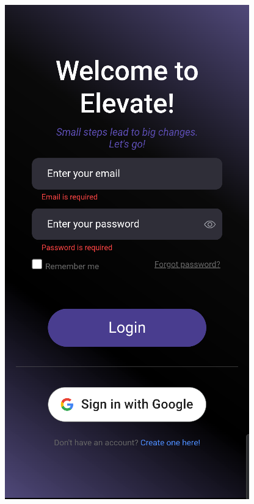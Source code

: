 \documentclass[12pt]{report}
\begin{document}
\begin{figure}[H]
    \centering
    \begin{minipage}[b]{0.23\textwidth}
        \centering
        \includegraphics[width=\linewidth]{src/loginpage1.png}

\end{minipage}
\end{figure}
\end{document}
